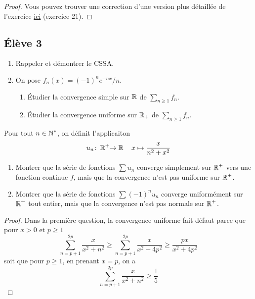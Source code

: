 \documentclass[10pt]{scrartcl}
\begin{document}
    \begin{proof}
        Vous pouvez trouver une correction d'une version plus détaillée de l'exercice \href{https://www.bibmath.net/ressources/index.php?action=affiche&quoi=mathspe/feuillesexo/suiserfonc&type=fexo}{ici} (exercice 21).
    \end{proof}

    \subsection*{Élève 3}
    \begin{ccp}\hfill
        \begin{enumerate}
            \item Rappeler et démontrer le CSSA.
            \item On pose $f_n(x)=(-1)^ne^{-nx}/n$. 
            \begin{enumerate}
                \item Étudier la convergence simple sur $\operatorname{\mathbb R}$ de $\sum_{n\geq 1} f_n$. 
                \item Étudier la convergence uniforme sur $\operatorname{\mathbb R}_+$ de $\sum_{n\geq 1} f_n$.
            \end{enumerate}
        \end{enumerate}
    \end{ccp}

    \begin{exo}
        Pour tout $n\in\operatorname{\mathbb N}^*$, on définit l'applicaiton
        \[
            u_n\colon\operatorname{\mathbb R}^+\hskip-.3em\to\operatorname{\mathbb R}\quad x\mapsto\frac x{n^2+x^2}
        \]
        \begin{enumerate}
            \item Montrer que la série de fonctions $\sum u_n$ converge simplement sur $\operatorname{\mathbb R}^+$ vers une fonction continue $f$, mais que la convergence n'est pas uniforme sur $\operatorname{\mathbb R}^+$.
            \item Montrer que la série de fonctions $\sum (-1)^nu_n$ converge uniformément sur $\operatorname{\mathbb R}^+$ tout entier, mais que la convergence n'est pas normale sur $\operatorname{\mathbb R}^+$.
        \end{enumerate}
    \end{exo}

    \begin{proof}
        Dans la première question, la convergence uniforme fait défaut parce que pour $x>0$ et $p\geq 1$
        \[
            \sum_{n=p+1}^{2p}\frac{x}{x^2+n^2}\geq\sum_{n=p+1}^{2p}\frac{x}{x^2+4p^2}\geq\frac{px}{x^2+4p^2}
        \]
        soit que pour $p\geq 1$, en prenant $x=p$, on a 
        \[
            \sum_{n=p+1}^{2p}\frac{x}{x^2+n^2}\geq \frac15
        \]
    \end{proof}
\end{document}
